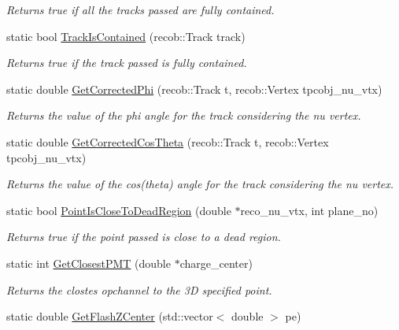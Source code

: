 \begin{DoxyCompactItemize}
\begin{DoxyCompactList}\small\item\em Returns true if all the tracks passed are fully contained. \end{DoxyCompactList}\item 
static bool \hyperlink{classUBXSecHelper_aa0349c7d405ec64cd1b0c7ed3d54a56e}{Track\-Is\-Contained} (recob\-::\-Track track)
\begin{DoxyCompactList}\small\item\em Returns true if the track passed is fully contained. \end{DoxyCompactList}\item 
static double \hyperlink{classUBXSecHelper_a79b61783bfe19d8dcd33d6aba4c3e61a}{Get\-Corrected\-Phi} (recob\-::\-Track t, recob\-::\-Vertex tpcobj\-\_\-nu\-\_\-vtx)
\begin{DoxyCompactList}\small\item\em Returns the value of the phi angle for the track considering the nu vertex. \end{DoxyCompactList}\item 
static double \hyperlink{classUBXSecHelper_aefae2cc8a7598aa54848247ad228371e}{Get\-Corrected\-Cos\-Theta} (recob\-::\-Track t, recob\-::\-Vertex tpcobj\-\_\-nu\-\_\-vtx)
\begin{DoxyCompactList}\small\item\em Returns the value of the cos(theta) angle for the track considering the nu vertex. \end{DoxyCompactList}\item 
static bool \hyperlink{classUBXSecHelper_a7df598dfbdfdb620737fd69297e67faf}{Point\-Is\-Close\-To\-Dead\-Region} (double $\ast$reco\-\_\-nu\-\_\-vtx, int plane\-\_\-no)
\begin{DoxyCompactList}\small\item\em Returns true if the point passed is close to a dead region. \end{DoxyCompactList}\item 
static int \hyperlink{classUBXSecHelper_a88533a5a59d61351437a1fe2e54aff25}{Get\-Closest\-P\-M\-T} (double $\ast$charge\-\_\-center)
\begin{DoxyCompactList}\small\item\em Returns the clostes opchannel to the 3\-D specified point. \end{DoxyCompactList}\item 
static double \hyperlink{classUBXSecHelper_a3fd25ef568b54aded55d6c1b6a8593fa}{Get\-Flash\-Z\-Center} (std\-::vector$<$ double $>$ pe)

\end{DoxyCompactItemize}

